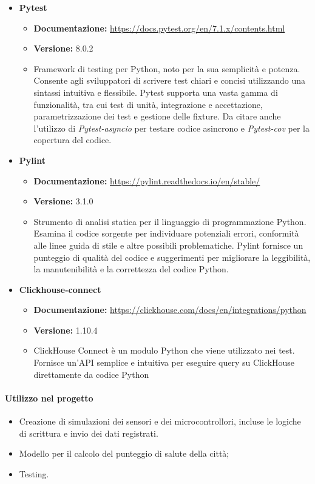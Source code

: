 \begin{itemize}
    \item \textbf{Pytest}
    \begin{itemize}
        \item \textbf{Documentazione:} \href{https://docs.pytest.org/en/7.1.x/contents.html}{https://docs.pytest.org/en/7.1.x/contents.html}
        \item \textbf{Versione:} 8.0.2
        \item Framework di testing per Python, noto per la sua semplicità e potenza. Consente agli sviluppatori di scrivere test chiari e concisi utilizzando una sintassi intuitiva e flessibile. Pytest supporta una vasta gamma di funzionalità, tra cui test di unità, integrazione e accettazione, parametrizzazione dei test e gestione delle fixture. Da citare anche l'utilizzo di \textit{Pytest-asyncio} per testare codice asincrono e \textit{Pytest-cov} per la copertura del codice.
    \end{itemize}
    
    \item \textbf{Pylint}
    \begin{itemize}
        \item \textbf{Documentazione:} \href{https://pylint.readthedocs.io/en/stable/}{https://pylint.readthedocs.io/en/stable/}
        \item \textbf{Versione:} 3.1.0
        \item Strumento di analisi statica per il linguaggio di programmazione Python. Esamina il codice sorgente per individuare potenziali errori, conformità alle linee guida di stile e altre possibili problematiche. Pylint fornisce un punteggio di qualità del codice e suggerimenti per migliorare la leggibilità, la manutenibilità e la correttezza del codice Python.
    \end{itemize}
    
    \item \textbf{Clickhouse-connect}
    \begin{itemize}
        \item \textbf{Documentazione:} \href{https://clickhouse.com/docs/en/integrations/python}{https://clickhouse.com/docs/en/integrations/python}
        \item \textbf{Versione:} 1.10.4
        \item ClickHouse Connect è un modulo Python che viene utilizzato nei test. Fornisce un'API semplice e intuitiva per eseguire query su ClickHouse direttamente da codice Python
    \end{itemize}
\end{itemize}

\paragraph{Utilizzo nel progetto}
\begin{itemize}
    \item Creazione di simulazioni dei sensori e dei microcontrollori, incluse le logiche di scrittura e invio dei dati registrati.
    \item Modello per il calcolo del punteggio di salute della città;
    \item Testing.
    \end{itemize}